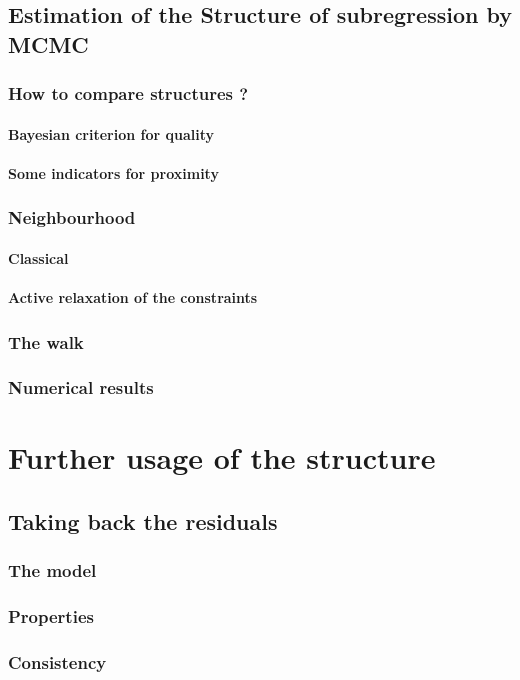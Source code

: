 \documentclass[11pt,a4paper]{report}
\begin{document}
\chapter{Estimation of the Structure of subregression by MCMC}
	\section{How to compare structures ?}
		\subsection{Bayesian criterion for quality}
		\subsection{Some indicators for proximity}
	\section{Neighbourhood}
		\subsection{Classical}
		\subsection{Active relaxation of the constraints}
	\section{The walk}
	\section{Numerical results}
\part{Further usage of the structure}	
\chapter{Taking back the residuals}
	\section{The model}
	\section{Properties}
	\section{Consistency}
\end{document}
